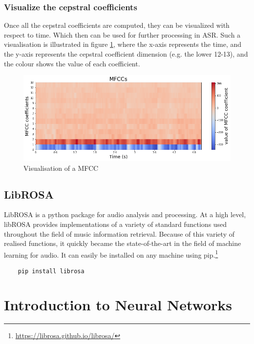 \subsubsection{Visualize the cepstral coefficients}
Once all the cepstral coefficients are computed, they can be visualized with respect to time. Which then can be used for further processing in \gls{ASR}. Such a visualisation is illustrated in figure \ref{fig:MFCC-Visualisation}, where the x-axis represents the time, and the y-axis represents the cepstral coefficient dimension (e.g. the lower 12-13), and the colour shows the value of each coefficient.
\begin{figure}[htbp]
	\centering
	\includegraphics[scale=0.5]{baa-documentation/img/MFCC_Visualisation.png}
	\caption[Visualisation of an MFCC]{Visualisation of a MFCC}
	\label{fig:MFCC-Visualisation}
\end{figure}

\subsection{LibROSA}
\label{sub:Librosa}

LibROSA is a python package for audio analysis and processing. At a high level, libROSA provides implementations of a variety of standard functions used throughout the ﬁeld of music information retrieval. Because of this variety of realised functions, it quickly became the state-of-the-art in the field of machine learning for audio. It can easily be installed on any machine using pip.\footnote{\url{https://librosa.github.io/librosa/}}

\begin{verbatim}
    pip install librosa
\end{verbatim}

\section{Introduction to Neural Networks}
\label{sec:Intro-NN}

